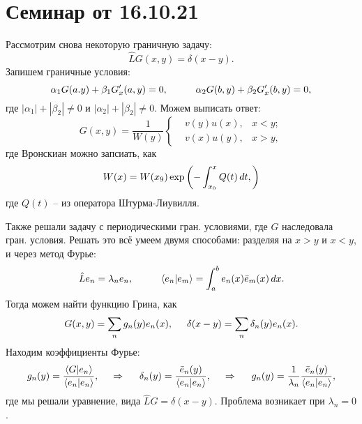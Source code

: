 \section{Семинар от 16.10.21}

Рассмотрим снова некоторую граничную задачу:
\begin{equation*}
    \hat{L} G(x, y) = \delta(x-y).
\end{equation*}
Запишем граничные условия:
\begin{equation*}
    \alpha_1 G(a. y) + \beta_1 G'_x(a, y) = 0,
    \hspace{10 mm} 
    \alpha_2 G(b, y) + \beta_2 G'_x (b, y) = 0,
\end{equation*}
где  $|\alpha_1| + |\beta_2| \neq 0$ и $|\alpha_2| + |\beta_2| \neq 0$.
Можем выписать ответ:
\begin{equation*}
    G(x, y) = \frac{1}{W(y)} \left\{\begin{aligned}
        &v(y) u(x), &x < y; \\
        &v(x) u(y), &x > y,
    \end{aligned}\right.
\end{equation*}
где Вронскиан можно запсиать, как
\begin{equation*}
    W(x) = W(x_9) \exp\left(
        - \int_{x_0}^{x}  Q(t) \, d t,
    \right)
\end{equation*}
где $Q(t)$ -- из оператора Штурма-Лиувилля. 

Также решали задачу с периодическими гран. условиями, где $G$ наследовала гран. условия. 
Решать это всё умеем двумя способами: разделяя на $x  > y$ и $x < y$, и через метод Фурье:
\begin{equation*}
    \hat{L} e_n  = \lambda_n e_n,
    \hspace{10 mm} 
    \langle e_n | e_m \rangle = \int_{a}^{b} e_n (x) \bar{e}_m(x)  \d x.
\end{equation*}
Тогда можем найти функцию Грина, как
\begin{equation*}
    G(x, y) = \sum_n g_n (y) e_n (x),
    \hspace{5 mm} 
    \delta(x-y) = \sum_n \delta_n ( y) e_n (x).
\end{equation*}
Находим коэффициенты Фурье:
\begin{equation*}
    g_n (y) = 
    \frac{\langle G | e_n\rangle}{\langle e_n | e_n\rangle},
    \hspace{0.5cm} \Rightarrow \hspace{0.5cm}
    \delta_n (y) = \frac{\bar{e}_n (y)}{\langle e_n | e_n\rangle},
    \hspace{0.5cm} \Rightarrow \hspace{0.5cm}
    g_n (y) = \frac{1}{\lambda_n} \frac{\bar{e}_n (y)}{\langle e_n | e_n\rangle},
\end{equation*}
где мы решали уравнение, вида $\hat{L} G = \delta(x-y)$. 
Проблема возникает при $\lambda_n = 0$. 




